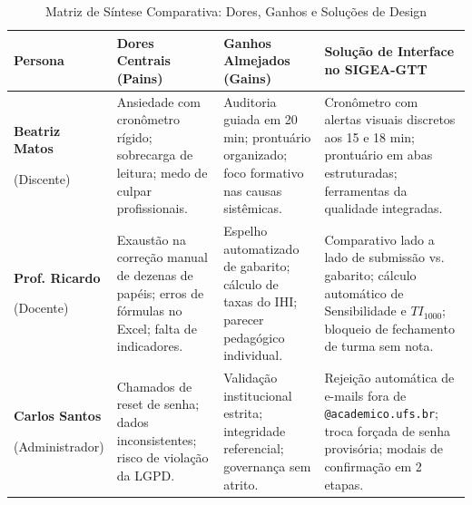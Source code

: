 \begin{table}[!ht]
\centering
\caption{Matriz de Síntese Comparativa: Dores, Ganhos e Soluções de Design}
\label{tab_sintese_mapas_empatia}
\footnotesize
\begin{tabularx}{\textwidth}{p{2.6cm} p{3.8cm} p{4.2cm} X}
\toprule
\textbf{Persona} & \textbf{Dores Centrais (Pains)} & \textbf{Ganhos Almejados (Gains)} & \textbf{Solução de Interface no SIGEA-GTT} \\
\midrule
\textbf{Beatriz Matos} \par (Discente) & Ansiedade com cronômetro rígido; sobrecarga de leitura; medo de culpar profissionais. & Auditoria guiada em 20 min; prontuário organizado; foco formativo nas causas sistêmicas. & Cronômetro com alertas visuais discretos aos 15 e 18 min; prontuário em abas estruturadas; ferramentas da qualidade integradas. \\
\addlinespace
\textbf{Prof. Ricardo} \par (Docente) & Exaustão na correção manual de dezenas de papéis; erros de fórmulas no Excel; falta de indicadores. & Espelho automatizado de gabarito; cálculo de taxas do IHI; parecer pedagógico individual. & Comparativo lado a lado de submissão vs. gabarito; cálculo automático de Sensibilidade e $TI_{1000}$; bloqueio de fechamento de turma sem nota. \\
\addlinespace
\textbf{Carlos Santos} \par (Administrador) & Chamados de reset de senha; dados inconsistentes; risco de violação da LGPD. & Validação institucional estrita; integridade referencial; governança sem atrito. & Rejeição automática de e-mails fora de \texttt{@academico.ufs.br}; troca forçada de senha provisória; modais de confirmação em 2 etapas. \\
\bottomrule
\end{tabularx}
\end{table}
